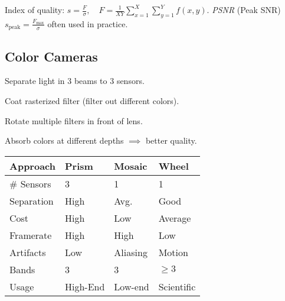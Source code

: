 \begin{definition}[SNR]
  Index of quality: \(s = \frac{F}{\sigma}, \quad F = \frac{1}{XY}\sum_{x=1}^X\sum_{y=1}^Y f(x, y)\). \textit{PSNR} (Peak SNR) \(s_\text{peak} = \frac{F_{\max}}{\sigma}\) often used in practice.
\end{definition}

\subsection{Color Cameras}
\begin{definition}[Prism]
  Separate light in 3 beams to 3 sensors.
\end{definition}

\begin{definition}
  Coat rasterized filter (filter out different colors).
\end{definition}

\begin{definition}
  Rotate multiple filters in front of lens.
\end{definition}

\begin{definition}[CMOS]
  Absorb colors at different depths \(\implies\) better quality.
\end{definition}

\begin{tabularx}{\linewidth}{|X|X|X|X|}
  \hline
  Approach & Prism & Mosaic & Wheel \\ \hline
  \# Sensors & 3 & 1 & 1 \\ \hline
  Separation & High & Avg. & Good \\ \hline
  Cost & High & Low & Average \\ \hline
  Framerate & High & High & Low \\ \hline
  Artifacts & Low & Aliasing & Motion \\ \hline
  Bands & 3 & 3 & \(\geq 3\) \\ \hline
  Usage & High-End & Low-end & Scientific \\ \hline
\end{tabularx}

